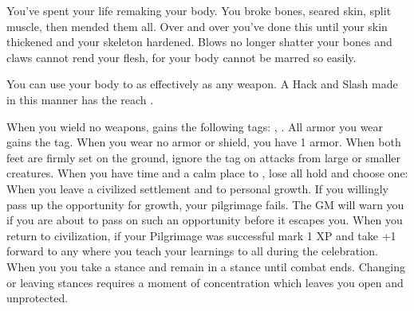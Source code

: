 \documentclass[darkmode]{dw_playbook}
\begin{document}
    {
            {You’ve spent your life remaking your body.  You broke bones, seared skin, split muscle, then mended them all.  Over and over you’ve done this until your skin thickened and your skeleton hardened.  Blows no longer shatter your bones and claws cannot rend your flesh, for your body cannot be marred so easily.

            You can use your body to  as effectively as any weapon.  A Hack and Slash made in this manner has the reach .}
        \gap
        \gap
            {When you wield no weapons,  gains the following tags: , .  All armor you wear gains the  tag.}
        \gap
            {When you wear no armor or shield, you have 1 armor.  When both feet are firmly set on the ground, ignore the  tag on attacks from large or smaller creatures.}
        \gap
            {When you have time and a calm place to , lose all hold and choose one:
            \gapSm
            \gapSm
            \gapSm
            \gap}
            {When you leave a civilized settlement and  to personal growth.
            \gapSm
            \gapSm
            \gapSm
            \gapSm
            \gapSm
            \gapSm
            \gap
            If you willingly pass up the opportunity for growth, your pilgrimage fails.  The GM will warn you if you are about to pass on such an opportunity before it escapes you.  When you return to civilization, if your Pilgrimage was successful mark 1 XP and take +1 forward to any  where you teach your learnings to all during the celebration.}
        \gap
            {When you  you take a stance and remain in a stance until combat ends.  Changing or leaving stances requires a moment of concentration which leaves you open and unprotected.
            \gapSm
            \gapSm
            \gapSm
            }
    }
\end{document}
